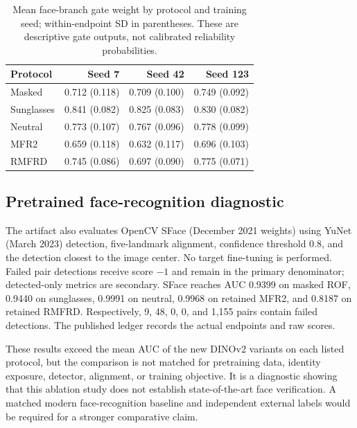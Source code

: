 \documentclass[10pt,journal,compsoc]{IEEEtran}
\begin{document}
\begin{table}[t]
\centering
\caption{Mean face-branch gate weight by protocol and training seed; within-endpoint SD in parentheses. These are descriptive gate outputs, not calibrated reliability probabilities.}
\label{tab:gatedistribution}
\begin{tabular}{lrrr}
\toprule
Protocol & Seed 7 & Seed 42 & Seed 123\\
\midrule
Masked & 0.712 (0.118) & 0.709 (0.100) & 0.749 (0.092)\\
Sunglasses & 0.841 (0.082) & 0.825 (0.083) & 0.830 (0.082)\\
Neutral & 0.773 (0.107) & 0.767 (0.096) & 0.778 (0.099)\\
MFR2 & 0.659 (0.118) & 0.632 (0.117) & 0.696 (0.103)\\
RMFRD & 0.745 (0.086) & 0.697 (0.090) & 0.775 (0.071)\\
\bottomrule
\end{tabular}
\end{table}
\subsection{Pretrained face-recognition diagnostic}
The artifact also evaluates OpenCV SFace \cite{sface} (December 2021 weights) using YuNet \cite{yunet} (March 2023) detection, five-landmark alignment, confidence threshold 0.8, and the detection closest to the image center. No target fine-tuning is performed. Failed pair detections receive score $-1$ and remain in the primary denominator; detected-only metrics are secondary. SFace reaches AUC 0.9399 on masked ROF, 0.9440 on sunglasses, 0.9991 on neutral, 0.9968 on retained MFR2, and 0.8187 on retained RMFRD. Respectively, 9, 48, 0, 0, and 1,155 pairs contain failed detections. The published ledger records the actual endpoints and raw scores.

These results exceed the mean AUC of the new DINOv2 variants on each listed protocol, but the comparison is not matched for pretraining data, identity exposure, detector, alignment, or training objective. It is a diagnostic showing that this ablation study does not establish state-of-the-art face verification. A matched modern face-recognition baseline and independent external labels would be required for a stronger comparative claim.
\end{document}
